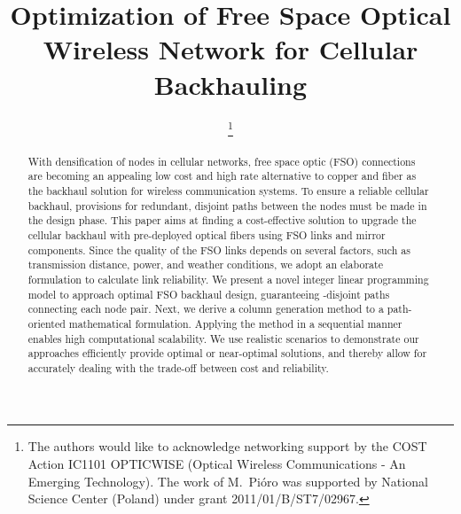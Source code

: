 \documentclass[onecolumn,11pt,draftclsnofoot]{IEEEtran}
\begin{document}
\title{Optimization of Free Space Optical Wireless Network for Cellular Backhauling}

\author{

\thanks{The authors would like to acknowledge networking support by the COST Action IC1101 OPTICWISE (Optical Wireless Communications - An Emerging Technology). The work of M.~Pi\'{o}ro was supported by National Science Center (Poland) under grant 2011/01/B/ST7/02967.}
}

\maketitle

\begin{abstract}

With densification of nodes in cellular networks, free space optic (FSO) connections are becoming an appealing low cost and high rate alternative to copper and fiber as the backhaul solution for wireless communication systems. To ensure a reliable cellular backhaul, provisions for redundant, disjoint paths between the nodes must be made in the design phase. This paper aims at finding a cost-effective solution to upgrade the cellular backhaul with pre-deployed optical fibers using FSO links and mirror components. Since the quality of the FSO links depends on several factors, such as transmission distance, power, and weather conditions, we adopt an elaborate formulation to calculate link reliability. We present a novel integer linear programming model to approach optimal FSO backhaul design, guaranteeing -disjoint paths connecting each node pair. Next, we derive a column generation method to a path-oriented mathematical formulation. Applying the method in a sequential manner enables high computational scalability. We use realistic scenarios to demonstrate our approaches efficiently provide optimal or near-optimal solutions, and thereby allow for accurately dealing with the trade-off between cost and reliability.

\end{abstract}
\end{document}
